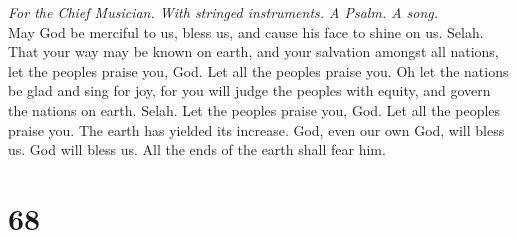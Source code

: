 \emph{For the Chief Musician. With stringed instruments. A Psalm. A
song.}\\
 May God be merciful to us, bless us, and cause his face
to shine on us. Selah.  That your way may be known on
earth, and your salvation amongst all nations,  let the
peoples praise you, God. Let all the peoples praise you. 
Oh let the nations be glad and sing for joy, for you will judge the
peoples with equity, and govern the nations on earth. Selah.
 Let the peoples praise you, God. Let all the peoples
praise you.  The earth has yielded its increase. God, even
our own God, will bless us.  God will bless us. All the
ends of the earth shall fear him.

\hypertarget{section-67}{%
\section{68}\label{section-67}}


